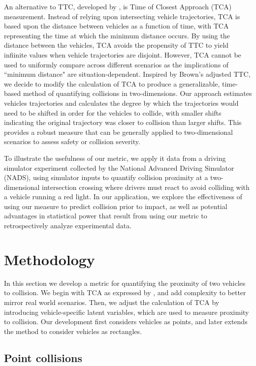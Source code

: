 \documentclass{article}
\begin{document}
An alternative to TTC, developed by \citet{Schwarz2014}, is Time of Closest Approach (TCA) measurement.  Instead of relying upon intersecting vehicle trajectories, TCA is based upon the distance between vehicles as a function of time, with TCA representing the time at which the minimum distance occurs. By using the distance between the vehicles, TCA avoids the propensity of TTC to yield infiinite values when vehicle trajectories are disjoint. However, TCA cannot be used to uniformly compare across different scenarios as the implications of ``minimum distance" are situation-dependent. Inspired by Brown's adjusted TTC, we decide to modify the calculation of TCA to produce a generalizable, time-based method of quantifying collisions in two-dimensions.  Our approach estimates vehicles trajectories and calculates the degree by which the trajectories would need to be shifted in order for the vehicles to collide, with smaller shifts indicating the original trajectory was closer to collision than larger shifts. This provides a robust measure that can be generally applied to two-dimensional scenarios to assess safety or collision severity.

To illustrate the usefulness of our metric, we apply it data from a driving simulator experiment collected by the National Advanced Driving Simulator (NADS), using simulator inputs to quantify collision proximity at a two-dimensional intersection crossing where drivers must react to avoid colliding with a vehicle running a red light.  In our application, we explore the effectiveness of using our measure to predict collision prior to impact, as well as potential advantages in statistical power that result from using our metric to retrospectively analyze experimental data.

\section{Methodology}

In this section we develop a metric for quantifying the proximity of two vehicles to collision. We begin with TCA as expressed by \citet{Schwarz2014}, and add complexity to better mirror real world scenarios. Then, we adjust the calculation of TCA by introducing vehicle-specific latent variables, which are used to measure proximity to collision.  Our development first considers vehicles as points, and later extends the method to consider vehicles as rectangles.

\subsection{Point collisions}
\end{document}
